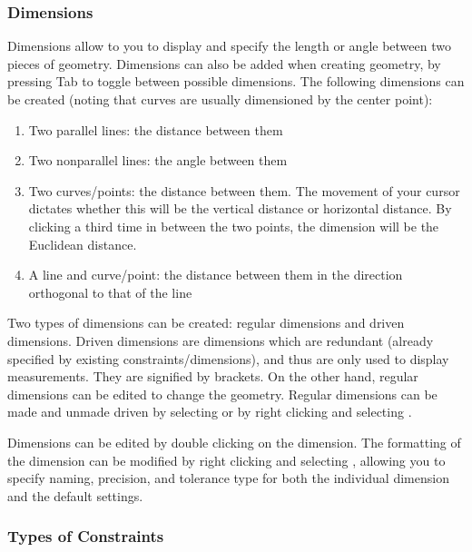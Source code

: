 \subsubsection{Dimensions}
Dimensions allow to you to display and specify the length or angle between two pieces of geometry. Dimensions can also be added when creating geometry, by pressing Tab to toggle between possible dimensions. The following dimensions can be created (noting that curves are usually dimensioned by the center point):

\begin{enumerate}
\item Two parallel lines: the distance between them
\item Two nonparallel lines: the angle between them
\item Two curves/points: the distance between them. The movement of your cursor dictates whether this will be the vertical distance or horizontal distance. By clicking a third time in between the two points, the dimension will be the Euclidean distance.
\item A line and curve/point: the distance between them in the direction orthogonal to that of the line
\end{enumerate}

Two types of dimensions can be created: regular dimensions and driven dimensions. Driven dimensions are dimensions which are redundant (already specified by existing constraints/dimensions), and thus are only used to display measurements. They are signified by brackets. On the other hand, regular dimensions can be edited to change the geometry. Regular dimensions can be made and unmade driven by selecting  or by right clicking and selecting .

Dimensions can be edited by double clicking on the dimension. The formatting of the dimension can be modified by right clicking and selecting , allowing you to specify naming, precision, and tolerance type for both the individual dimension and the default settings.


\subsubsection{Types of Constraints}


